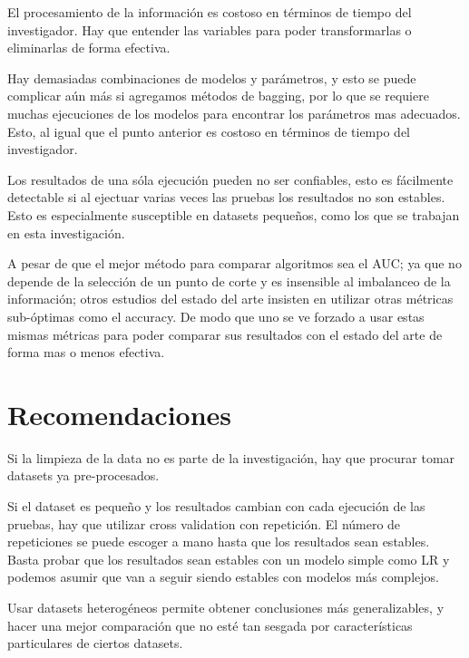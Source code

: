 El procesamiento de la información es costoso en términos de tiempo del investigador. Hay que entender las variables para poder transformarlas o eliminarlas de forma efectiva.

Hay demasiadas combinaciones de modelos y parámetros, y esto se puede complicar aún más si agregamos métodos de bagging, por lo que se requiere muchas ejecuciones de los modelos para encontrar los parámetros mas adecuados. Esto, al igual que el punto anterior es costoso en términos de tiempo del investigador.

Los resultados de una sóla ejecución pueden no ser confiables, esto es fácilmente detectable si al ejectuar varias veces las pruebas los resultados no son estables. Esto es especialmente susceptible en datasets pequeños, como los que se trabajan en esta investigación.

A pesar de que el mejor método para comparar algoritmos sea el AUC; ya que no depende de la selección de un punto de corte y es insensible al imbalanceo de la información; otros estudios del estado del arte insisten en utilizar otras métricas sub-óptimas como el accuracy. De modo que uno se ve forzado a usar estas mismas métricas para poder comparar sus resultados con el estado del arte de forma mas o menos efectiva.


\section{Recomendaciones}

Si la limpieza de la data no es parte de la investigación, hay que procurar tomar datasets ya pre-procesados.

Si el dataset es pequeño y los resultados cambian con cada ejecución de las pruebas, hay que utilizar cross validation con repetición. El número de repeticiones se puede escoger a mano hasta que los resultados sean estables. Basta probar que los resultados sean estables con un modelo simple como \ac{LR} y podemos asumir que van a seguir siendo estables con modelos más complejos.

Usar datasets heterogéneos permite obtener conclusiones más generalizables, y hacer una mejor comparación que no esté tan sesgada por características particulares de ciertos datasets.


